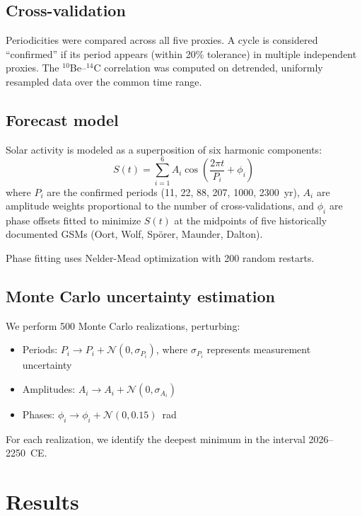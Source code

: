 \documentclass[twocolumn,preprintnumbers,amsmath,amssymb]{revtex4-2}
\begin{document}
\subsection{Cross-validation}

Periodicities were compared across all five proxies. A cycle is considered ``confirmed'' if its period appears (within 20\% tolerance) in multiple independent proxies. The $^{10}$Be--$^{14}$C correlation was computed on detrended, uniformly resampled data over the common time range.

\subsection{Forecast model}

Solar activity is modeled as a superposition of six harmonic components:
\begin{equation}
    S(t) = \sum_{i=1}^{6} A_i \cos\!\left(\frac{2\pi t}{P_i} + \phi_i\right)
\label{eq:model}
\end{equation}
where $P_i$ are the confirmed periods (11, 22, 88, 207, 1000, 2300~yr), $A_i$ are amplitude weights proportional to the number of cross-validations, and $\phi_i$ are phase offsets fitted to minimize $S(t)$ at the midpoints of five historically documented GSMs (Oort, Wolf, Sp\"orer, Maunder, Dalton).

Phase fitting uses Nelder-Mead optimization with 200 random restarts.

\subsection{Monte Carlo uncertainty estimation}

We perform 500 Monte Carlo realizations, perturbing:
\begin{itemize}
    \item Periods: $P_i \to P_i + \mathcal{N}(0, \sigma_{P_i})$, where $\sigma_{P_i}$ represents measurement uncertainty
    \item Amplitudes: $A_i \to A_i + \mathcal{N}(0, \sigma_{A_i})$
    \item Phases: $\phi_i \to \phi_i + \mathcal{N}(0, 0.15)$~rad
\end{itemize}

For each realization, we identify the deepest minimum in the interval 2026--2250~CE.

\section{Results}
\label{sec:results}
\end{document}
